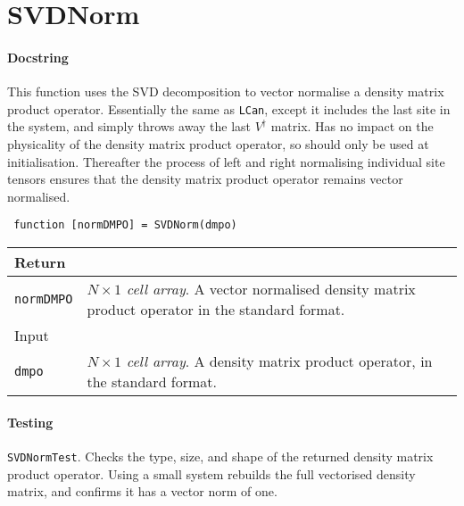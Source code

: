  \section{SVDNorm}
 \paragraph{Docstring} This function uses the SVD decomposition to vector normalise a density matrix product operator. Essentially the same as \lstinline$LCan$, except it includes the last site in the system, and simply throws away the last \(V^{\dagger}\) matrix. Has no impact on the physicality of the density matrix product operator, so should only be used at initialisation. Thereafter the process of left and right normalising individual site tensors ensures that the density matrix product operator remains vector normalised.
 \begin{lstlisting}
 function [normDMPO] = SVDNorm(dmpo) \end{lstlisting}
 \begin{longtabu}{X[1,l]X[4,l]}
 \hline
 Return & \\ \hline
 \lstinline$normDMPO$ & \emph{\(N \times 1\) cell array}. A vector normalised density matrix product operator in the standard format. \\ \hline
 Input & \\ \hline
 \lstinline$dmpo$ & \emph{\(N \times 1\) cell array}. A density matrix product operator, in the standard format. \\
 \hline
 \end{longtabu}
 \paragraph{Testing} \lstinline$SVDNormTest$. Checks the type, size, and shape of the returned density matrix product operator. Using a small system rebuilds the full vectorised density matrix, and confirms it has a vector norm of one.
